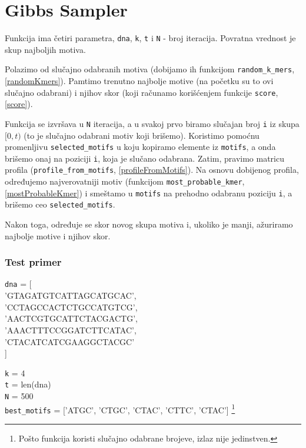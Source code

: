 \section{Gibbs Sampler}

Funkcija ima četiri parametra, \texttt{dna}, \texttt{k}, \texttt{t} i \texttt{N} - broj iteracija. Povratna vrednost je skup najboljih motiva.

Polazimo od slučajno odabranih motiva (dobijamo ih funkcijom \texttt{random\_k\_mers}, \ref{randomKmers}). Pamtimo trenutno najbolje motive (na početku su to ovi slučajno odabrani) i njihov skor (koji računamo korišćenjem funkcije \texttt{score}, \ref{score}).

Funkcija se izvršava u \texttt{N} iteracija, a u svakoj prvo biramo slučajan broj \texttt{i} iz skupa $[0, t)$ (to je slučajno odabrani motiv koji brišemo). Koristimo pomoćnu promenljivu \texttt{selected\_motifs} u koju kopiramo elemente iz \texttt{motifs}, a onda brišemo onaj na poziciji \texttt{i}, koja je slučano odabrana. Zatim, pravimo matricu profila (\texttt{profile\_from\_motifs}, \ref{profileFromMotifs}). Na osnovu dobijenog profila, određujemo najverovatniji motiv (funkcijom \texttt{most\_probable\_kmer}, \ref{mostProbableKmer}) i smeštamo u \texttt{motifs} na prehodno odabranu poziciju \texttt{i}, a brišemo ceo \texttt{selected\_motifs}.

Nakon toga, određuje se skor novog skupa motiva i, ukoliko je manji, ažuriramo najbolje motive i njihov skor.
  





\subsubsection{Test primer}
\noindent\texttt{dna} = [ \\
\indent'GTAGATGTCATTAGCATGCAC', \\
\indent'CCTAGCCACTCTGCCATGTCG', \\
\indent'AACTCGTGCATTCTACGACTG', \\
\indent'AAACTTTCCGGATCTTCATAC', \\
\indent'CTACATCATCGAAGGCTACGC' \\
]

\noindent \texttt{k} = 4
\\\texttt{t} = len(dna)
\\\texttt{N} = 500
\\\texttt{best\_motifs} = ['ATGC', 'CTGC', 'CTAC', 'CTTC', 'CTAC'] \footnote{Pošto funkcija koristi slučajno odabrane brojeve, izlaz nije jedinstven.}